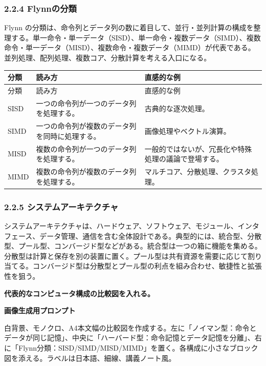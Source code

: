 \documentclass[a4paper,11pt]{ltjsarticle}
\begin{document}
\subsubsection{2.2.4 Flynnの分類}

Flynn の分類は、命令列とデータ列の数に着目して、並行・並列計算の構成を整理する。単一命令・単一データ（SISD）、単一命令・複数データ（SIMD）、複数命令・単一データ（MISD）、複数命令・複数データ（MIMD）が代表である。並列処理、配列処理、複数コア、分散計算を考える入口になる。

\begin{longtable}{>{\raggedright\arraybackslash}p{}>{\raggedright\arraybackslash}p{}>{\raggedright\arraybackslash}p{}}
\toprule
分類 & 読み方 & 直感的な例 \\
\midrule
\endfirsthead
\toprule
分類 & 読み方 & 直感的な例 \\
\midrule
\endhead
SISD & 一つの命令列が一つのデータ列を処理する。 & 古典的な逐次処理。 \\
SIMD & 一つの命令列が複数のデータ列を同時に処理する。 & 画像処理やベクトル演算。 \\
MISD & 複数の命令列が一つのデータ列を処理する。 & 一般的ではないが、冗長化や特殊処理の議論で登場する。 \\
MIMD & 複数の命令列が複数のデータ列を処理する。 & マルチコア、分散処理、クラスタ処理。 \\
\bottomrule
\end{longtable}

\subsubsection{2.2.5 システムアーキテクチャ}

システムアーキテクチャは、ハードウェア、ソフトウェア、モジュール、インタフェース、データ管理、通信を含む全体設計である。典型的には、統合型、分散型、プール型、コンバージド型などがある。統合型は一つの箱に機能を集める。分散型は計算と保存を別の装置に置く。プール型は共有資源を需要に応じて割り当てる。コンバージド型は分散型とプール型の利点を組み合わせ、敏捷性と拡張性を狙う。

\begin{todobox}
\textbf{代表的なコンピュータ構成の比較図を入れる。}\par
\textbf{画像生成用プロンプト}\par
白背景、モノクロ、A4本文幅の比較図を作成する。左に「ノイマン型：命令とデータが同じ記憶」、中央に「ハーバード型：命令記憶とデータ記憶を分離」、右に「Flynn分類：SISD/SIMD/MISD/MIMD」を置く。各構成に小さなブロック図を添える。ラベルは日本語、細線、講義ノート風。

\end{todobox}
\end{document}
